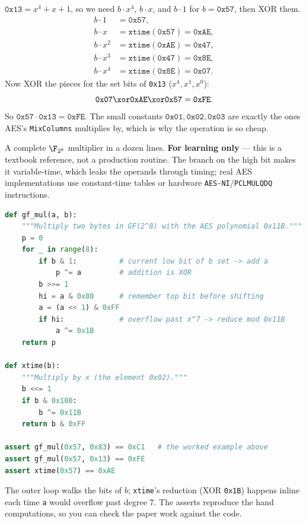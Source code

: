\begin{example}
\label{ch06:ex-mul13}
$\texttt{0x13} = x^4 + x + 1$, so we need $b\cdot x^4$, $b\cdot x$, and
$b\cdot 1$ for $b=\texttt{0x57}$, then XOR them.
\[
\begin{aligned}
b\cdot 1 &= \texttt{0x57},\\
b\cdot x &= \texttt{xtime}(\texttt{0x57}) = \texttt{0xAE},\\
b\cdot x^2 &= \texttt{xtime}(\texttt{0xAE}) = \texttt{0x47},\\
b\cdot x^3 &= \texttt{xtime}(\texttt{0x47}) = \texttt{0x8E},\\
b\cdot x^4 &= \texttt{xtime}(\texttt{0x8E}) = \texttt{0x07}.
\end{aligned}
\]
Now XOR the pieces for the set bits of \texttt{0x13} ($x^4, x^1, x^0$):
\[
\texttt{0x07} \xor \texttt{0xAE} \xor \texttt{0x57} = \texttt{0xFE}.
\]
So $\texttt{0x57}\cdot\texttt{0x13} = \texttt{0xFE}$. The small constants
$\texttt{0x01},\texttt{0x02},\texttt{0x03}$ are exactly the ones AES's
\texttt{MixColumns} multiplies by, which is why the operation is so cheap.
\end{example}

\begin{implementbox}
A complete $\F_{2^8}$ multiplier in a dozen lines. \textbf{For learning
only} --- this is a textbook reference, not a production routine. The branch
on the high bit makes it variable-time, which leaks the operands through
timing; real AES implementations use constant-time tables or hardware
\texttt{AES-NI}/\texttt{PCLMULQDQ} instructions.
\begin{lstlisting}[language=Python]
def gf_mul(a, b):
    """Multiply two bytes in GF(2^8) with the AES polynomial 0x11B."""
    p = 0
    for _ in range(8):
        if b & 1:          # current low bit of b set -> add a
            p ^= a         # addition is XOR
        b >>= 1
        hi = a & 0x80      # remember top bit before shifting
        a = (a << 1) & 0xFF
        if hi:             # overflow past x^7 -> reduce mod 0x11B
            a ^= 0x1B
    return p

def xtime(b):
    """Multiply by x (the element 0x02)."""
    b <<= 1
    if b & 0x100:
        b ^= 0x11B
    return b & 0xFF

assert gf_mul(0x57, 0x83) == 0xC1   # the worked example above
assert gf_mul(0x57, 0x13) == 0xFE
assert xtime(0x57) == 0xAE
\end{lstlisting}
The outer loop walks the bits of $b$; \texttt{xtime}'s reduction (XOR
\texttt{0x1B}) happens inline each time \texttt{a} would overflow past degree
$7$. The asserts reproduce the hand computations, so you can check the paper
work against the code.
\end{implementbox}

